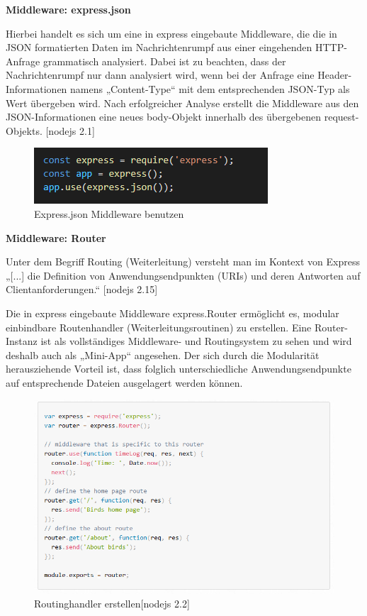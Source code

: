 \textbf{Middleware: express.json}
\newline

Hierbei handelt es sich um eine in express eingebaute Middleware, die die in JSON formatierten Daten im Nachrichtenrumpf aus einer eingehenden HTTP-Anfrage grammatisch analysiert.  Dabei ist zu beachten, dass der Nachrichtenrumpf nur dann analysiert wird, wenn bei der Anfrage eine Header-Informationen namens „Content-Type“ mit dem entsprechenden JSON-Typ als Wert übergeben wird. Nach erfolgreicher Analyse erstellt die Middleware aus den JSON-Informationen eine neues body-Objekt innerhalb des übergebenen request-Objekts. [nodejs 2.1]
\newline

\begin{figure}[h]
\centering
\includegraphics{images/nodejs_expressJson.PNG}
\caption{Express.json Middleware benutzen}
\end{figure}

\newpage
\textbf{Middleware: Router}
\newline

Unter dem Begriff Routing (Weiterleitung) versteht man im Kontext von Express „[...] die Definition von Anwendungsendpunkten (URIs) und deren Antworten auf Clientanforderungen.“ [nodejs 2.15]
\newline

Die in express eingebaute Middleware express.Router ermöglicht es, modular einbindbare Routenhandler (Weiterleitungsroutinen) zu erstellen. Eine Router-Instanz ist als vollständiges Middleware- und Routingsystem zu sehen und wird deshalb auch als „Mini-App“ angesehen. Der sich durch die Modularität herausziehende Vorteil ist, dass folglich unterschiedliche Anwendungsendpunkte auf entsprechende Dateien ausgelagert werden können.
\newline

\begin{figure}[h]
\centering
\includegraphics[width=14cm]{images/nodejs_expressRoutererstellen.PNG}
\caption{Routinghandler erstellen[nodejs 2.2]}
\end{figure}

